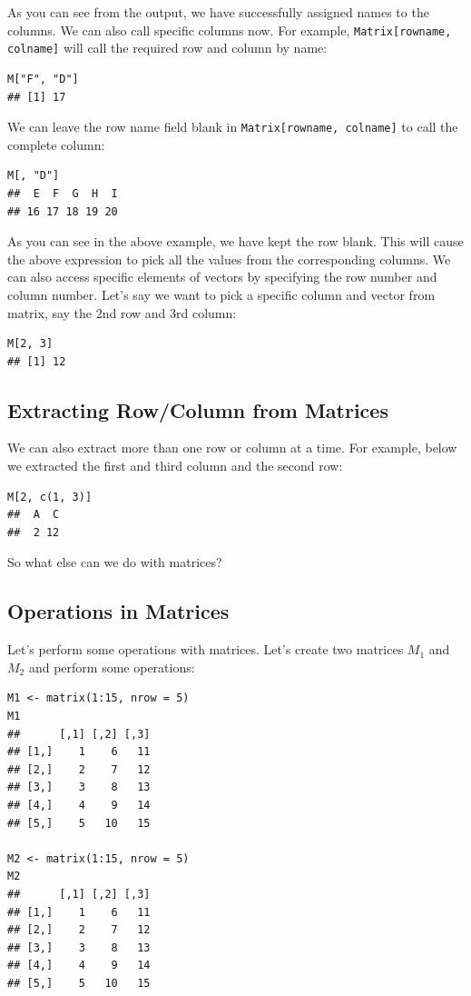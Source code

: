 \documentclass[12pt]{book}
\begin{document}
As you can see from the output, we have successfully assigned names to the columns. We can also call specific columns now. For example, \texttt{Matrix[rowname, colname]} will call the required row and column by name:

\begin{verbatim}
M["F", "D"]
## [1] 17
\end{verbatim}

We can leave the row name field blank in \texttt{Matrix[rowname, colname]} to call the complete column:

\begin{verbatim}
M[, "D"]
##  E  F  G  H  I 
## 16 17 18 19 20
\end{verbatim}

As you can see in the above example, we have kept the row blank. This will cause the above expression to pick all the values from the corresponding columns. We can also access specific elements of vectors by specifying the row number and column number. Let’s say we want to pick a specific column and vector from matrix, say the 2nd row and 3rd column:

\begin{verbatim}
M[2, 3]
## [1] 12
\end{verbatim}

\subsection{Extracting Row/Column from Matrices}

We can also extract more than one row or column at a time. For example, below we extracted the first and third column and the second row:

\begin{verbatim}
M[2, c(1, 3)]
##  A  C 
##  2 12
\end{verbatim}

So what else can we do with matrices?

\subsection{Operations in Matrices}

Let’s perform some operations with matrices. Let’s create two matrices \( M_1 \) and \( M_2 \) and perform some operations:

\begin{verbatim}
M1 <- matrix(1:15, nrow = 5)
M1
##      [,1] [,2] [,3]
## [1,]    1    6   11
## [2,]    2    7   12
## [3,]    3    8   13
## [4,]    4    9   14
## [5,]    5   10   15

M2 <- matrix(1:15, nrow = 5)
M2
##      [,1] [,2] [,3]
## [1,]    1    6   11
## [2,]    2    7   12
## [3,]    3    8   13
## [4,]    4    9   14
## [5,]    5   10   15
\end{verbatim}
\end{document}
